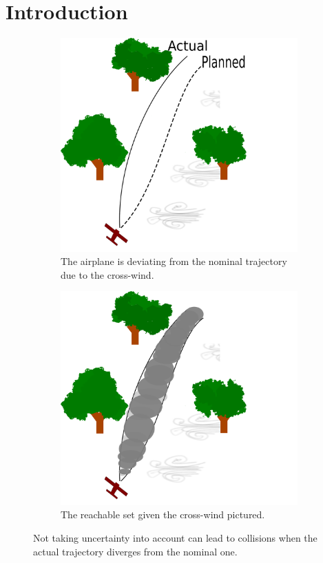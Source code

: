 \chapter{Introduction}
\label{sec:intro}

\begin{figure}[h]
  \begin{subfigure}{0.5\textwidth}
    \includegraphics[width=\textwidth]{figures/experiments/experiment-setup-no-funnel}
    \caption{The airplane is deviating from the nominal trajectory due to the
      cross-wind.}
  \end{subfigure}%
  \;
  \begin{subfigure}{0.5\textwidth}
    \includegraphics[width=\textwidth]{figures/experiments/experiment-setup-funnel}
    \caption{The reachable set given the cross-wind pictured.}
  \end{subfigure}
  \caption{Not taking uncertainty into account can lead to collisions when the
    actual trajectory diverges from the nominal one.}
  \label{fig:motion-planning-uncertainty}
\end{figure}

